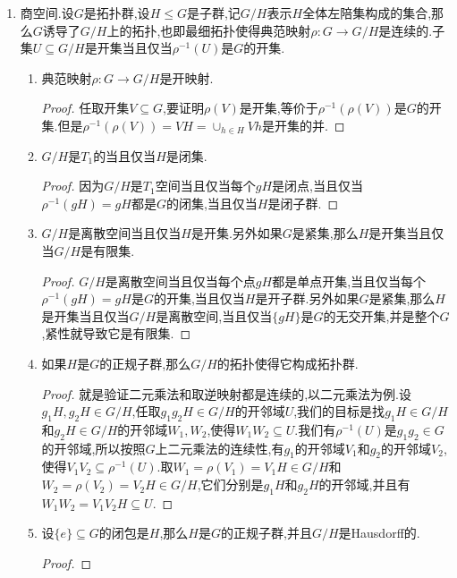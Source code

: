 \begin{enumerate}
\begin{proof}
    	$G_0$是$G$的正规子群:任取$x\in G_0$,那么$x^{-1}G_0$也是一个包含$x$的连通子集,于是$x^{-1}G_0\subseteq G_0$,也即$G_0^{-1}\subseteq G_0$.于是$xG_0$也是包含$e$的连通子集,进而有$xG_0\subseteq G_0$,也即$G_0G_0\subseteq G_0$,这说明$G_0$是子群.同样的任取$y\in G$有$yG_0y^{-1}$是$e$的连通子集,导致$yG_0y^{-1}\subseteq G_0$,于是$G_0$是正规子群.
    \end{proof}
    \item 商空间.设$G$是拓扑群,设$H\le G$是子群,记$G/H$表示$H$全体左陪集构成的集合,那么$G$诱导了$G/H$上的拓扑,也即最细拓扑使得典范映射$\rho:G\to G/H$是连续的.子集$U\subseteq G/H$是开集当且仅当$\rho^{-1}(U)$是$G$的开集.
    \begin{enumerate}[(1)]
    	\item 典范映射$\rho:G\to G/H$是开映射.
    	\begin{proof}
    		
    		任取开集$V\subseteq G$,要证明$\rho(V)$是开集,等价于$\rho^{-1}(\rho(V))$是$G$的开集.但是$\rho^{-1}(\rho(V))=VH=\cup_{h\in H}Vh$是开集的并.
    	\end{proof}
    	\item $G/H$是$T_1$的当且仅当$H$是闭集.
    	\begin{proof}
    		
    		因为$G/H$是$T_1$空间当且仅当每个$gH$是闭点,当且仅当$\rho^{-1}(gH)=gH$都是$G$的闭集,当且仅当$H$是闭子群.
    	\end{proof}
    	\item $G/H$是离散空间当且仅当$H$是开集.另外如果$G$是紧集,那么$H$是开集当且仅当$G/H$是有限集.
    	\begin{proof}
    		
    		$G/H$是离散空间当且仅当每个点$gH$都是单点开集,当且仅当每个$\rho^{-1}(gH)=gH$是$G$的开集,当且仅当$H$是开子群.另外如果$G$是紧集,那么$H$是开集当且仅当$G/H$是离散空间,当且仅当$\{gH\}$是$G$的无交开集,并是整个$G$,紧性就导致它是有限集.
    	\end{proof}
    	\item 如果$H$是$G$的正规子群,那么$G/H$的拓扑使得它构成拓扑群.
    	\begin{proof}
    		
    		就是验证二元乘法和取逆映射都是连续的,以二元乘法为例.设$g_1H,g_2H\in G/H$,任取$g_1g_2H\in G/H$的开邻域$U$,我们的目标是找$g_1H\in G/H$和$g_2H\in G/H$的开邻域$W_1,W_2$,使得$W_1W_2\subseteq U$.我们有$\rho^{-1}(U)$是$g_1g_2\in G$的开邻域,所以按照$G$上二元乘法的连续性,有$g_1$的开邻域$V_1$和$g_2$的开邻域$V_2$,使得$V_1V_2\subseteq\rho^{-1}(U)$.取$W_1=\rho(V_1)=V_1H\in G/H$和$W_2=\rho(V_2)=V_2H\in G/H$,它们分别是$g_1H$和$g_2H$的开邻域,并且有$W_1W_2=V_1V_2H\subseteq U$.
    	\end{proof}
    	\item 设$\{e\}\subseteq G$的闭包是$H$,那么$H$是$G$的正规子群,并且$G/H$是Hausdorff的.
    	\begin{proof}
    		

\end{proof}
\end{enumerate}
\end{enumerate}
